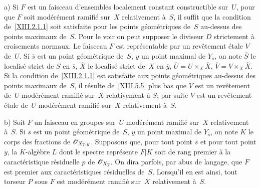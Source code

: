 \begin{remarques}
\label{XIII.2.3}

a) Si $F$ est un faisceau d'ensembles localement constant
constructible sur~$U$, pour que $F$ soit mod\'er\'ement
ramifi\'e sur~$X$ relativement \`a~$S$, il suffit que la condition
de~\ref{XIII.2.1.1} soit satisfaite pour les points
g\'eom\'etriques de~$S$ au-dessus des points maximaux de~$S$. Pour
le voir on peut supposer le diviseur $D$ strictement \`a croisements
normaux. Le faisceau $F$ est repr\'esentable par un rev\^etement
\'etale $V$ de~$U$. Si $\overline{s}$ est un point
g\'eom\'etrique de~$S$, $y$ un point maximal de
$Y_{\overline{s}}$, on note $\overline{S}$ le localis\'e strict de
$S$ en $\overline{s}$, $\overline{X}$ le localis\'e strict de~$X$ en
$\overline{y}$, $\overline{U}=U\times_X \overline{X}$,
$\overline{V}=V\times_X\overline{X}$. Si la condition
de~\ref{XIII.2.1.1} est satisfaite aux points g\'eom\'etriques
au-dessus des points maximaux de~$S$, il r\'esulte de~\ref{XIII.5.5}
plus bas que $\overline{V}$ est un rev\^etement de~$\overline{U}$
mod\'er\'ement ramifi\'e sur~$\overline{X}$ relativement \`a
$\overline{S}$; par suite $V$ est un rev\^etement \'etale de~$U$
mod\'er\'ement ramifi\'e sur~$X$ relativement \`a~$S$.

b)
Soit $F$ un faisceau en groupes sur~$U$ mod\'er\'ement
ramifi\'e sur~$X$ relativement \`a~$S$. Si $\overline{s}$ est un
point g\'eom\'etrique de~$S$, $y$ un point maximal de
$Y_{\overline{s}}$, on note $K$ le corps des fractions de
$\cal{O}_{X_{\overline{s}},y}$. Supposons que, pour tout point
$\overline{s}$ et pour tout point $y$, la $K$-alg\`ebre $L$ dont le
spectre repr\'esente $F|K$ soit de rang premier \`a la
caract\'eristique r\'esiduelle $p$ de
$\cal{O}_{X_{\overline{s}}}$. On dira parfois, par abus de langage,
que $F$ est premier aux caract\'eristiques r\'esiduelles de~$S$.
Lorsqu'il en est ainsi, tout torseur $P$ sous $F$ est
mod\'er\'ement ramifi\'e sur~$X$ relativement \`a~$S$.


\end{remarques}
